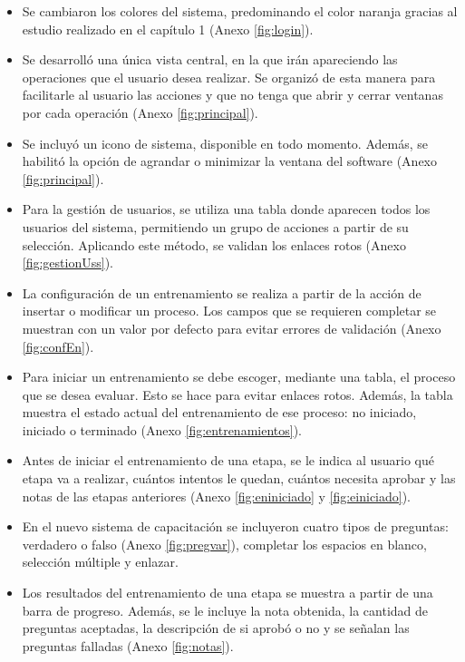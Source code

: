 \begin{itemize}
\item Se cambiaron los colores del sistema, predominando el color naranja gracias al estudio realizado en el capítulo 1 (Anexo \ref{fig:login}).
\item Se desarrolló una única vista central, en la que irán apareciendo las operaciones que el usuario desea realizar. Se organizó de esta manera para facilitarle al usuario las acciones y que no tenga que abrir y cerrar ventanas por cada operación (Anexo \ref{fig:principal}).
\item Se incluyó un icono de sistema, disponible en todo momento. Además, se habilitó la opción de agrandar o minimizar la ventana del software (Anexo \ref{fig:principal}).
\item Para la gestión de usuarios, se utiliza una tabla donde aparecen todos los usuarios del sistema, permitiendo un grupo de acciones a partir de su selección. Aplicando este método, se validan los enlaces rotos (Anexo \ref{fig:gestionUss}).
\item La configuración de un entrenamiento se realiza a partir de la acción de insertar o modificar un proceso. Los campos que se requieren completar se muestran con un valor por defecto para evitar errores de validación (Anexo \ref{fig:confEn}).
\item Para iniciar un entrenamiento se debe escoger, mediante una tabla, el proceso que se desea evaluar. Esto se hace para evitar enlaces rotos. Además, la tabla muestra el estado actual del entrenamiento de ese proceso: no iniciado, iniciado o terminado (Anexo \ref{fig:entrenamientos}).
\item Antes de iniciar el entrenamiento de una etapa, se le indica al usuario qué etapa va a realizar, cuántos intentos le quedan, cuántos necesita aprobar y las notas de las etapas anteriores (Anexo \ref{fig:eniniciado} y \ref{fig:einiciado}).
\item En el nuevo sistema de capacitación se incluyeron cuatro tipos de preguntas: verdadero o falso (Anexo \ref{fig:pregvar}), completar los espacios en blanco, selección múltiple y enlazar.
\item Los resultados del entrenamiento de una etapa se muestra a partir de una barra de progreso. Además, se le incluye la nota obtenida, la cantidad de preguntas aceptadas, la descripción de si aprobó o no y se señalan las preguntas falladas (Anexo \ref{fig:notas}).
\end{itemize}

